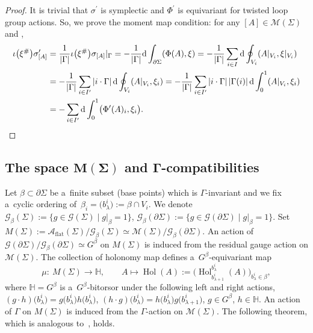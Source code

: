 \documentclass[10pt,a4paper]{amsart}
\numberwithin{equation}{section}
\theoremstyle{definition}
\newcommand{\Hol}{\operatorname{Hol}}
\newcommand{\bH}{\mathbb{H}}
\begin{document}
\begin{proof}
 It is trivial that $\sigma^{\prime}$ is symplectic and $\Phi^{\prime}$ is equivariant for twisted loop group actions.
 So, we prove the moment map condition:
 for any $[A] \in \mathcal{M}(\Sigma)$ and ,
\begin{align*}
 \iota\bigl(\xi^{\#}\bigr)\sigma^{\prime}_{[A]} &= \frac{1}{| \Gamma|} \iota\bigl(\xi^{\#}\bigr)\sigma_{[A]}|_{\Gamma}
 = -\frac{1}{| \Gamma|}{\rm d} \int_{\partial \Sigma} (\Phi(A), \xi)
 = -\frac{1}{| \Gamma|} \sum_{i \in I} {\rm d} \oint_{V_i}(A|_{V_i}, \xi|_{V_i}) \\
 &= -\frac{1}{| \Gamma|} \sum_{i \in I^{\prime}} \left| i \cdot \Gamma\right| {\rm d} \oint_{V_i}(A|_{V_i}, \xi_i)
 = -\frac{1}{| \Gamma|} \sum_{i \in I^{\prime}} \left| i \cdot \Gamma\right| \left| \Gamma(i)\right| {\rm d} \int_{0}^{1} (A|_{V_i}, \xi_i) \\
 &
 = - \sum_{i \in I^{\prime}} {\rm d}\int_{0}^{1} \bigl(\Phi^{\prime}(A)_i, \xi_i\bigr).\tag*{\qed}
\end{align*} \renewcommand{\qed}{}
\end{proof}

\subsection[The space M(Sigma) and Gamma-compatibilities]{The space $\boldsymbol{M(\Sigma)}$ and $\boldsymbol{\Gamma}$-compatibilities}


Let $\beta \subset \partial \Sigma$ be a~finite subset (base points) which is $\Gamma$-invariant and we fix a~cyclic ordering of~$\beta_i = \bigl(b^{i}_{\lambda}\bigr) := \beta \cap V_i$.
We denote
$\mathcal{G}_{\beta}(\Sigma) := \{g \in \mathcal{G}(\Sigma)\mid g|_{\beta} = 1\}$, $
 \mathcal{G}_{\beta}(\partial \Sigma) := \{g \in \mathcal{G}(\partial \Sigma)\mid g|_{\beta}=1\}$.
Set $M(\Sigma) := \mathcal{A}_{\mathrm{flat}}(\Sigma)/\mathcal{G}_{\beta}(\Sigma) \simeq \mathcal{M}(\Sigma)/\mathcal{G}_{\beta}(\partial \Sigma)$.
An action of $\mathcal{G}(\partial \Sigma)/\mathcal{G}_{\beta}(\partial \Sigma) \simeq G^{\beta}$ on $M(\Sigma)$ is induced from the residual gauge action on $\mathcal{M}(\Sigma)$.
The collection of holonomy map \smash{$\Hol^{b^i_{\lambda}}_{b^i_{\lambda+1}}(A)$} defines a~$G^{\beta}$-equivariant map
\[
\mu \colon\ M(\Sigma) \to \bH,\qquad A \mapsto \Hol(A) := \bigl(\Hol^{b^i_{\lambda}}_{b^i_{\lambda+1}}(A)\bigr)_{b^i_{\lambda} \in \beta},
\]
where $\bH = G^{\beta}$ is a~$G^{\beta}$-bitorsor under the following left and right actions,
$(g \cdot h)\bigl(b^{i}_{\lambda}\bigr) = g\bigl(b^i_{\lambda}\bigr)h\bigl(b^i_{\lambda}\bigr)$, $
 (h \cdot g)\bigl(b^i_{\lambda}\bigr) = h\bigl(b^i_{\lambda}\bigr)g\bigl(b^{i}_{\lambda+1}\bigr)$, $ g \in G^{\beta}$, $ h \in \bH$.
An action of $\Gamma$ on $M(\Sigma)$ is induced from the $\Gamma$-action on $\mathcal{M}(\Sigma)$.
The following theorem, which is analogous to~\cite[Theorem 9.1]{AMM}, holds.
\end{document}
